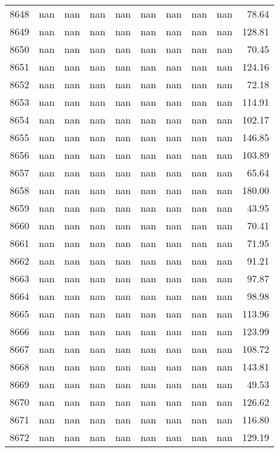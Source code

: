 \begin{tabular}{lrrrrrrrrr}
8648 & nan & nan & nan & nan & nan & nan & nan & nan & 78.64 \\
8649 & nan & nan & nan & nan & nan & nan & nan & nan & 128.81 \\
8650 & nan & nan & nan & nan & nan & nan & nan & nan & 70.45 \\
8651 & nan & nan & nan & nan & nan & nan & nan & nan & 124.16 \\
8652 & nan & nan & nan & nan & nan & nan & nan & nan & 72.18 \\
8653 & nan & nan & nan & nan & nan & nan & nan & nan & 114.91 \\
8654 & nan & nan & nan & nan & nan & nan & nan & nan & 102.17 \\
8655 & nan & nan & nan & nan & nan & nan & nan & nan & 146.85 \\
8656 & nan & nan & nan & nan & nan & nan & nan & nan & 103.89 \\
8657 & nan & nan & nan & nan & nan & nan & nan & nan & 65.64 \\
8658 & nan & nan & nan & nan & nan & nan & nan & nan & 180.00 \\
8659 & nan & nan & nan & nan & nan & nan & nan & nan & 43.95 \\
8660 & nan & nan & nan & nan & nan & nan & nan & nan & 70.41 \\
8661 & nan & nan & nan & nan & nan & nan & nan & nan & 71.95 \\
8662 & nan & nan & nan & nan & nan & nan & nan & nan & 91.21 \\
8663 & nan & nan & nan & nan & nan & nan & nan & nan & 97.87 \\
8664 & nan & nan & nan & nan & nan & nan & nan & nan & 98.98 \\
8665 & nan & nan & nan & nan & nan & nan & nan & nan & 113.96 \\
8666 & nan & nan & nan & nan & nan & nan & nan & nan & 123.99 \\
8667 & nan & nan & nan & nan & nan & nan & nan & nan & 108.72 \\
8668 & nan & nan & nan & nan & nan & nan & nan & nan & 143.81 \\
8669 & nan & nan & nan & nan & nan & nan & nan & nan & 49.53 \\
8670 & nan & nan & nan & nan & nan & nan & nan & nan & 126.62 \\
8671 & nan & nan & nan & nan & nan & nan & nan & nan & 116.80 \\
8672 & nan & nan & nan & nan & nan & nan & nan & nan & 129.19 \\

\end{tabular}
